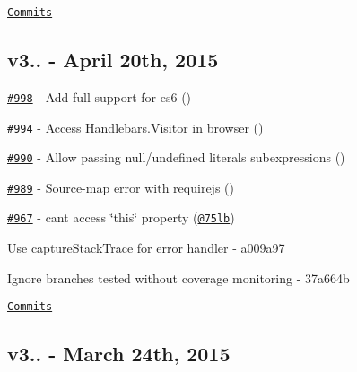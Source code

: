 \href{https://github.com/wycats/handlebars.js/compare/v3.0.2...v3.0.3}{\tt Commits}

\subsection*{v3.. -\/ April 20th, 2015}


\begin{DoxyItemize}
\item \href{https://github.com/wycats/handlebars.js/pull/998}{\tt \#998} -\/ Add full support for es6 (\href{https://api.github.com/users/kpdecker}{\tt })
\item \href{https://github.com/wycats/handlebars.js/issues/994}{\tt \#994} -\/ Access Handlebars.\+Visitor in browser (\href{https://api.github.com/users/tamlyn}{\tt })
\item \href{https://github.com/wycats/handlebars.js/issues/990}{\tt \#990} -\/ Allow passing null/undefined literals subexpressions (\href{https://api.github.com/users/blimmer}{\tt })
\item \href{https://github.com/wycats/handlebars.js/issues/989}{\tt \#989} -\/ Source-\/map error with requirejs (\href{https://api.github.com/users/SteppeEagle}{\tt })
\item \href{https://github.com/wycats/handlebars.js/issues/967}{\tt \#967} -\/ can\textquotesingle{}t access \char`\"{}this\char`\"{} property (\href{https://api.github.com/users/75lb}{\tt @75lb})
\item Use capture\+Stack\+Trace for error handler -\/ a009a97
\item Ignore branches tested without coverage monitoring -\/ 37a664b
\end{DoxyItemize}

\href{https://github.com/wycats/handlebars.js/compare/v3.0.1...v3.0.2}{\tt Commits}

\subsection*{v3.. -\/ March 24th, 2015}


